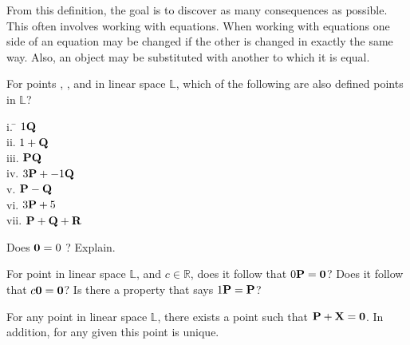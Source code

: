  From this definition, the goal is to discover as many consequences as possible. This often involves working with equations. When working with equations one side of an equation may be changed if  the other is changed in exactly the same way. Also, an object  may be substituted with another to which it is equal. 
 
 \begin{myexa}[\bd{a}]
 	For points , , and  in linear space $\mathbb{L}$, which of the following are also defined points in $\mathbb{L}$?
 	\begin{tabbing}
 		\indent i. \quad \= $1\textbf{Q}$\\
 		\indent ii. \> $1+\textbf{Q}$\\
 		\indent iii.\> $\textbf{P}\textbf{Q}$\\
 		\indent iv. \> $3\textbf{P} + -1\textbf{Q}$\\
 		\indent v.  \>  $\textbf{P} - \textbf{Q}$\\
 		\indent vi. \> $3\textbf{P} + 5$\\
 		\indent vii.\> $\textbf{P} + \textbf{Q}+ \textbf{R}$\\	
 	\end{tabbing}
 \end{myexa}
 
 \begin{myexb}[\bd{b}]
    Does $\textbf{0} = 0$ ? Explain.
 \end{myexb}


\begin{myexc}[\bd{c}]
For point  in linear space $\mathbb{L}$, and $c \in \mathbb{R}$, does it follow that $0\textbf{P}=\textbf{0}$? Does it follow that $c\textbf{0} = \textbf{0}$? Is there a property that says $1\textbf{P} = \textbf{P}$?
\end{myexc}

\begin{theorem}
	For any point  in linear space $\mathbb{L}$, there exists a point  such that $\textbf{P} + \textbf{X} = \textbf{0}$. In addition, for any given  this point is unique. 
\end{theorem}
\vspace{-.3in}\hspace{5in}\begin{annotation}
\end{annotation}
 

